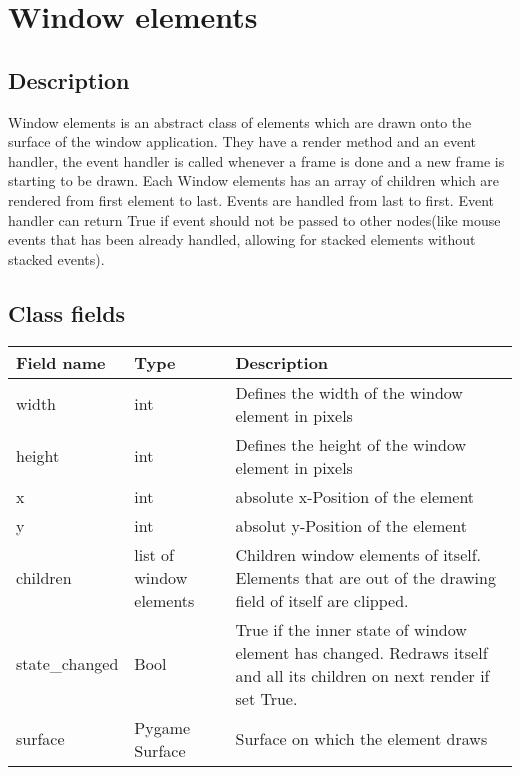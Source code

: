 \documentclass{scrartcl}
\begin{document}
    \section{Window elements}
    \subsection{Description}
    Window elements is an abstract class of elements which are drawn onto the surface of the window application. They have a render 
    method and an event handler, the event handler is called whenever a frame is done and a new frame is starting to be drawn. Each Window elements
    has an array of children which are rendered from first element to last. Events are handled from last to first. Event handler can return
    True if event should not be passed to other nodes(like mouse events that has been already handled, allowing for stacked elements without
    stacked events).
    \subsection{Class fields}
    \begin{tabular}{|p{}|p{}|p{}|}
        \hline
        Field name & Type & Description\\
        \hline
        width & int & Defines the width of the window element in pixels\\
        \hline
        height & int & Defines the height of the window element in pixels\\
        \hline
        x & int & absolute x-Position of the element\\
        \hline
        y & int & absolut y-Position of the element\\
        \hline
        children & list of window elements & Children window elements of itself. Elements that are out of the drawing field of itself are clipped.\\
        \hline
        state\_changed & Bool & True if the inner state of window element has changed. Redraws itself and all its children on next render if set True.\\
        \hline
        surface & Pygame Surface & Surface on which the element draws\\
        \hline
    \end{tabular}
\end{document}
